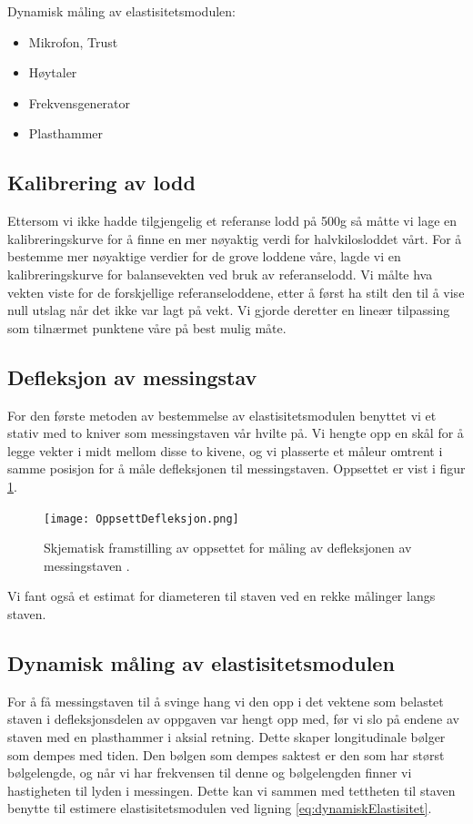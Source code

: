 \documentclass[a4paper,11pt, twocolumn]{article}
\begin{document}
Dynamisk måling av elastisitetsmodulen:
\begin{itemize}
	\item Mikrofon, Trust
	\item Høytaler 
	\item Frekvensgenerator 
	\item Plasthammer
\end{itemize}

\subsection{Kalibrering av lodd}
Ettersom vi ikke hadde tilgjengelig et referanse lodd på 500g så måtte vi lage en kalibreringskurve for å finne en mer nøyaktig verdi for halvkilosloddet vårt. For å bestemme mer nøyaktige verdier for de grove loddene våre, lagde vi en kalibreringskurve for balansevekten ved bruk av referanselodd. Vi målte hva vekten viste for de forskjellige referanseloddene, etter å først ha stilt den til å vise null utslag når det ikke var lagt på vekt. Vi gjorde deretter en lineær tilpassing som tilnærmet punktene våre på best mulig måte.

\subsection{Defleksjon av messingstav}
For den første metoden av bestemmelse av elastisitetsmodulen benyttet vi et stativ med to kniver som messingstaven vår hvilte på. Vi hengte opp en skål for å legge vekter i midt mellom disse to kivene, og vi plasserte et måleur omtrent i samme posisjon for å måle defleksjonen til messingstaven. Oppsettet er vist i figur \ref{fig:oppsett}.

\begin{figure}[!ht]
\texttt{[image: OppsettDefleksjon.png]}
\caption{Skjematisk framstilling av oppsettet for måling av defleksjonen av messingstaven \cite{oppgavetekst}.}
\label{fig:oppsett}
\end{figure}

Vi fant også et estimat for diameteren til staven ved en rekke målinger langs staven.

\subsection{Dynamisk måling av elastisitetsmodulen}
For å få messingstaven til å svinge hang vi den opp i det vektene som belastet staven i defleksjonsdelen av oppgaven var hengt opp med, før vi slo på endene av staven med en plasthammer i aksial retning. Dette skaper longitudinale bølger som dempes med tiden. Den bølgen som dempes saktest er den som har størst bølgelengde, og når vi har frekvensen til denne og bølgelengden finner vi hastigheten til lyden i messingen. Dette kan vi sammen med tettheten til staven benytte til estimere elastisitetsmodulen ved ligning \eqref{eq:dynamiskElastisitet}.
\end{document}
